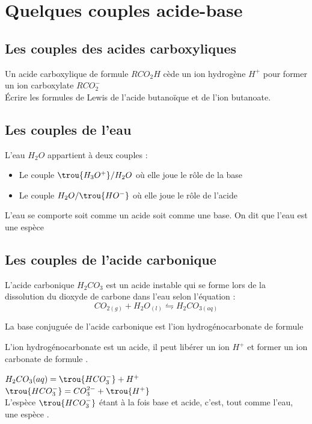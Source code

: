 \section{Quelques couples acide-base}
\subsection{Les couples des acides carboxyliques}
Un acide carboxylique de formule $RCO_2H$ cède un ion hydrogène $H^+$ pour former un ion carboxylate $RCO_2^-$\\

Écrire les formules de Lewis de l'acide butanoïque et de l'ion butanoate.
 
\subsection{Les couples de l'eau}
L'eau $H_2O$ appartient à deux couples :
\begin{itemize}
\item Le couple $\trou{H_3O^+}/H_2O$ où elle joue le rôle de la base
\item Le couple $H_2O/\trou{HO^-}$ où elle joue le rôle de l'acide
\end{itemize}
L'eau se comporte soit comme un acide soit comme une base. On dit que l'eau est une espèce 
\subsection{Les couples de l'acide carbonique}

L'acide carbonique $H_2CO_3$ est un acide instable qui se forme lors de la dissolution du dioxyde de carbone dans l'eau selon l'équation :
$$CO_{2(g)} + H_2O_{(l)} \leftrightharpoons H_2CO_{3(aq)}$$

La base conjuguée de l'acide carbonique est l'ion hydrogénocarbonate  de formule 

L'ion hydrogénocarbonate est un acide, il peut libérer un ion $H^+$ et former un ion carbonate de formule .


$ H_2CO_3(aq) =  \trou{HCO_3^-} + H^+$\\
$\trou{HCO_3^- }=  CO_3^{2-} +\trou{ H^+}$\\

L'espèce $\trou{HCO_3^-}$ étant à la fois base et acide, c'est, tout comme l'eau, une espèce .\\


